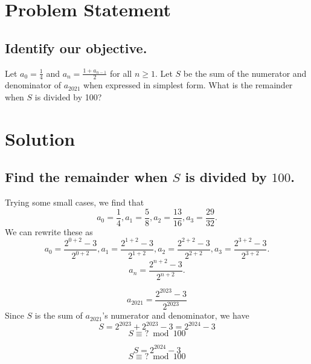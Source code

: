 \documentclass{beamer} %
\begin{document}
\begin{frame} %
  \titlepage
\end{frame}

\section{Problem Statement}

\subsection*{Identify our objective.}

\begin{frame}
Let $ a_0 = \frac{1}{4} $ and $ a_n = \frac{1 + a_{n-1}}{2} $ for all $n \ge 1$. Let $ S $ be the sum of the numerator and denominator of $ a_{2021} $ when expressed in simplest form. What is the remainder when $ S $ is divided by 100?
\end{frame}

\section{Solution}

\subsection*{Find the remainder when \texorpdfstring{$S$}{S} is divided by \texorpdfstring{$100$}{100}.}

\begin{frame}{}
Trying some small cases, we find that
\[
a_0 = \frac{1}{4}, a_1 = \frac{5}{8}, a_2 = \frac{13}{16}, a_3 = \frac{29}{32}.
\]
We can rewrite these as
\[
a_0 = \frac{2^{0+2}-3}{2^{0+2}}, a_1 = \frac{2^{1+2}-3}{2^{1+2}}, a_2 = \frac{2^{2+2}-3}{2^{2+2}}, a_3 = \frac{2^{3+2}-3}{2^{3+2}}.
\]
\[
a_n = \frac{2^{n+2}-3}{2^{n+2}}.
\]
\end{frame}

\begin{frame}
\[
a_{2021} = \frac{2^{2023}-3}{2^{2023}}
\]
Since $S$ is the sum of $a_{2021}$'s numerator and denominator, we have
\[
S = 2^{2023} + 2^{2023}-3 = 2^{2024} - 3
\]
\[
S \equiv \text{?} \bmod 100
\]
\end{frame}

\begin{frame}{}
\[
S = 2^{2024} - 3
\]
\[
S \equiv \text{?} \bmod 100
\]
\end{frame}
\end{document}
